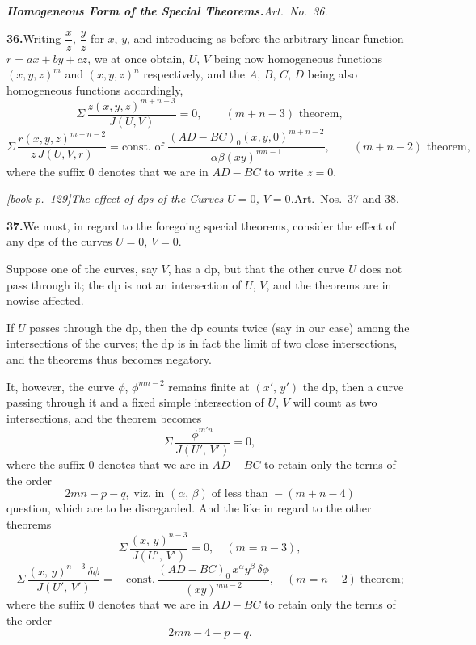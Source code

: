 \documentclass[11pt,a4paper]{article}
\theoremstyle{plain}
\theoremstyle{definition}
\theoremstyle{remark}
\begin{document}
\medskip\noindent\textit{\textbf{Homogeneous Form of the Special Theorems.}\quad Art.\ No.~36.}

\medskip\noindent\textbf{36.}\quad Writing $\dfrac{x}{z}$, $\dfrac{y}{z}$
for $x$, $y$, and introducing as before the arbitrary linear function
$r=ax+by+cz$, we at once obtain, $U$, $V$ being now homogeneous functions
$(x,y,z)^m$ and $(x,y,z)^n$ respectively, and the $A$, $B$, $C$, $D$ being
also homogeneous functions accordingly,
\[
\Sigma\,\frac{z(x,y,z)^{m+n-3}}{J(U,V)} = 0,
\qquad (m+n-3)\text{ theorem},
\]
\[
\Sigma\,\frac{r(x,y,z)^{m+n-2}}{z\,J(U,V,r)}
= \text{const. of }\frac{(AD-BC)_0(x,y,0)^{m+n-2}}{\alpha\beta(xy)^{mn-1}},
\qquad (m+n-2)\text{ theorem},
\]
where the suffix $0$ denotes that we are in $AD-BC$ to write $z=0$.

\noindent\textit{[book p.~129]}\quad \textit{The effect of dps of the Curves $U = 0$, $V = 0$.}\quad Art.\ Nos.\ 37 and 38.

\medskip\noindent\textbf{37.}\quad We must, in regard to the foregoing special theorems, consider the effect of any dps of the curves $U = 0$, $V = 0$.

Suppose one of the curves, say $V$, has a dp, but that the other curve $U$ does not pass through it; the dp is not an intersection of $U$, $V$, and the theorems are in nowise affected.

If $U$ passes through the dp, then the dp counts twice (say in our case) among the intersections of the curves; the dp is in fact the limit of two close intersections, and the theorems thus becomes negatory.

It, however, the curve $\phi$, $\phi^{mn-2}$ remains finite at $(x',\,y')$ the dp, then a curve passing through it and a fixed simple intersection of $U$, $V$ will count as two intersections, and the theorem becomes
\[
\Sigma\,\frac{\phi^{m'n}}{J(U',\,V')} = 0,
\]
where the suffix $0$ denotes that we are in $AD - BC$ to retain only the terms of the order
\[
2mn - p - q,\;\text{viz.\ in }(\alpha,\,\beta)\;\text{of less than }-(m + n - 4)
\]
question, which are to be disregarded. And the like in regard to the other theorems
\[
\Sigma\,\frac{(x,\,y)^{n-3}}{J(U',\,V')} = 0,\quad (m = n - 3),
\]
\[
\Sigma\,\frac{(x,\,y)^{n-3}\,\delta\phi}{J(U',\,V')} = -\,\text{const.}\,\frac{(AD - BC)_0\,x^\alpha y^\beta\,\delta\phi}{(xy)^{mn-2}},\quad (m = n - 2)\;\text{theorem;}
\]
where the suffix $0$ denotes that we are in $AD - BC$ to retain only the terms of the order
\[
2mn - 4 - p - q.
\]
\end{document}
